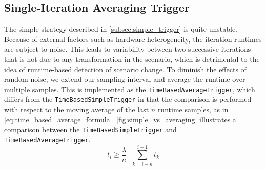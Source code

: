 \subsection{Single-Iteration Averaging Trigger}
The simple strategy described in \autoref{subsec:simple_trigger} is quite unstable. Because of external factors such as hardware heterogeneity, the iteration runtimes are subject to noise. This leads to variability between two successive iterations that is not due to any transformation in the scenario, which is detrimental to the idea of runtime-based detection of scenario change. To diminish the effects of random noise, we extend our sampling interval and average the runtime over multiple samples. This is implemented as the \texttt{TimeBasedAverageTrigger}, which differs from the \texttt{TimeBasedSimpleTrigger} in that the comparison is performed with respect to the  moving average of the last $n$ runtime samples, as in \eqref{eq:time_based_average_formula}. \autoref{fig:simple_vs_averaging} illustrates a comparison between the \texttt{TimeBasedSimpleTrigger} and \texttt{TimeBasedAverageTrigger}.
\begin{equation}
	t_i \ge \frac{\lambda}{n}\cdot \sum_{k=i-n}^{i-1}t_{k}\label{eq:time_based_average_formula}
\end{equation}

